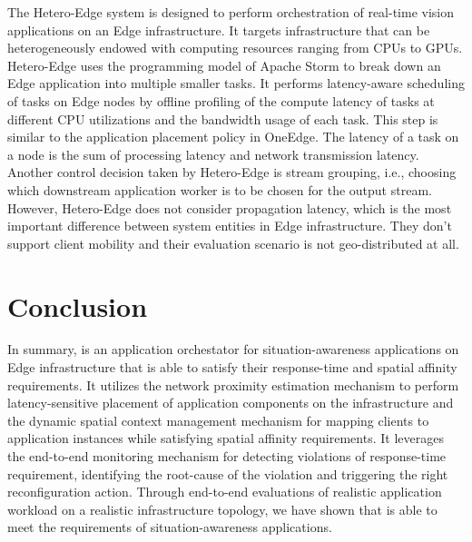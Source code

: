 \par The Hetero-Edge system \cite{zhang2019hetero} is designed to perform orchestration of real-time vision applications on an Edge infrastructure. It targets infrastructure that can be heterogeneously endowed with computing resources ranging from CPUs to GPUs. Hetero-Edge uses the programming model of Apache Storm to break down an Edge application into multiple smaller tasks. It performs latency-aware scheduling of tasks on Edge nodes by offline profiling of the compute latency of tasks at different CPU utilizations and the bandwidth usage of each task. This step is similar to the application placement policy in OneEdge. The latency of a task on a node is the sum of processing latency and network transmission latency. Another control decision taken by Hetero-Edge is stream grouping, i.e., choosing which downstream application worker is to be chosen for the output stream. However, Hetero-Edge does not consider propagation latency, which is the most important difference between system entities in Edge infrastructure. They don’t support client mobility and their evaluation scenario is not geo-distributed at all.


\section{Conclusion}
\label{sec:oneedge_conclusion}
In summary, \oneedge{} is an application orchestator for situation-awareness applications on Edge infrastructure that is able to satisfy their response-time and spatial affinity requirements. It utilizes the network proximity estimation mechanism to perform latency-sensitive placement of application components on the infrastructure and the dynamic spatial context management mechanism for mapping clients to application instances while satisfying spatial affinity requirements. It leverages the end-to-end monitoring mechanism for detecting violations of response-time requirement, identifying the root-cause of the violation and triggering the right reconfiguration action. Through end-to-end evaluations of realistic application workload on a realistic infrastructure topology, we have shown that \oneedge{} is able to meet the requirements of situation-awareness applications.
